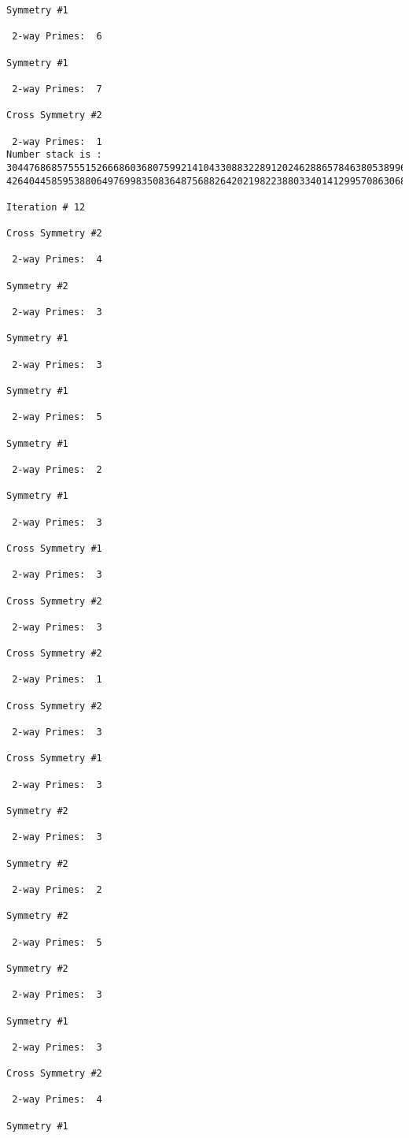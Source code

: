 {{{{\begin{verbatim}
Symmetry #1

 2-way Primes: 	6

Symmetry #1

 2-way Primes: 	7

Cross Symmetry #2

 2-way Primes: 	1
Number stack is :
30447686857555152666860368075992141043308832289120246288657846380538996794608835958544046240163340857
42640445859538806497699835083648756882642021982238803340141299570863068666251555758686744037580433610

Iteration #	12

Cross Symmetry #2

 2-way Primes: 	4

Symmetry #2

 2-way Primes: 	3

Symmetry #1

 2-way Primes: 	3

Symmetry #1

 2-way Primes: 	5

Symmetry #1

 2-way Primes: 	2

Symmetry #1

 2-way Primes: 	3

Cross Symmetry #1

 2-way Primes: 	3

Cross Symmetry #2

 2-way Primes: 	3

Cross Symmetry #2

 2-way Primes: 	1

Cross Symmetry #2

 2-way Primes: 	3

Cross Symmetry #1

 2-way Primes: 	3

Symmetry #2

 2-way Primes: 	3

Symmetry #2

 2-way Primes: 	2

Symmetry #2

 2-way Primes: 	5

Symmetry #2

 2-way Primes: 	3

Symmetry #1

 2-way Primes: 	3

Cross Symmetry #2

 2-way Primes: 	4

Symmetry #1


\end{verbatim}}}}}
